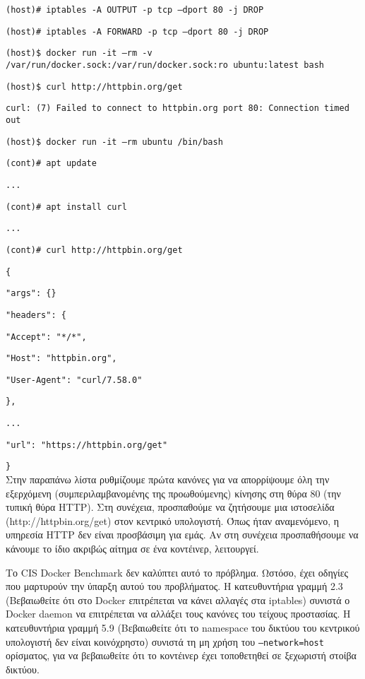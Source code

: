 \texttt{\textlatin{(host)\# iptables -A OUTPUT -p tcp --dport 80 -j DROP}}

\texttt{\textlatin{(host)\# iptables -A FORWARD -p tcp --dport 80 -j DROP}}

\texttt{\textlatin{(host)\$ docker run -it --rm -v /var/run/docker.sock:/var/run/docker.sock:ro ubuntu:latest bash}}

\texttt{\textlatin{(host)\$ curl http://httpbin.org/get}}

\texttt{\textlatin{curl: (7) Failed to connect to httpbin.org port 80: Connection timed out}}

\texttt{\textlatin{(host)\$ docker run -it --rm ubuntu /bin/bash}}

\texttt{\textlatin{(cont)\# apt update}}

\texttt{\textlatin{...}}

\texttt{\textlatin{(cont)\# apt install curl}}

\texttt{\textlatin{...}}

\texttt{\textlatin{(cont)\# curl http://httpbin.org/get}}

\texttt{\textlatin{\{}}

\texttt{\textlatin{"args": \{\}}}

\texttt{\textlatin{"headers": \{}}

\texttt{\textlatin{"Accept": "*/*",}}

\texttt{\textlatin{"Host": "httpbin.org",}}

\texttt{\textlatin{"User-Agent": "curl/7.58.0"}}

\texttt{\textlatin{\},}}

\texttt{\textlatin{...}}

\texttt{\textlatin{"url": "https://httpbin.org/get"}}

\texttt{\textlatin{\}}} \\


Στην παραπάνω λίστα ρυθμίζουμε πρώτα κανόνες για να απορρίψουμε όλη την
εξερχόμενη (συμπεριλαμβανομένης της προωθούμενης) κίνησης στη θύρα 80 (την
τυπική θύρα \textlatin{HTTP}). Στη συνέχεια, προσπαθούμε να ζητήσουμε
μια ιστοσελίδα (\textlatin{http://httpbin.org/get}) στον κεντρικό υπολογιστή.
Όπως ήταν αναμενόμενο, η υπηρεσία \textlatin{HTTP} δεν είναι προσβάσιμη για
εμάς. Αν στη συνέχεια προσπαθήσουμε να κάνουμε το ίδιο ακριβώς αίτημα
σε ένα κοντέινερ, λειτουργεί.

Το \textlatin{CIS Docker Benchmark} δεν καλύπτει αυτό το πρόβλημα. Ωστόσο,
έχει οδηγίες που μαρτυρούν την ύπαρξη αυτού του προβλήματος. Η κατευθυντήρια
γραμμή 2.3 (Βεβαιωθείτε ότι στο \textlatin{Docker} επιτρέπεται να κάνει αλλαγές
στα \textlatin{iptables}) συνιστά ο \textlatin{Docker daemon} να επιτρέπεται να
αλλάξει τους κανόνες του τείχους προστασίας. Η κατευθυντήρια γραμμή 5.9
(Βεβαιωθείτε ότι το \textlatin{namespace} του δικτύου του κεντρικού υπολογιστή
δεν είναι κοινόχρηστο) συνιστά τη μη χρήση του \texttt{\textlatin{--network=host}}
ορίσματος, για να βεβαιωθείτε ότι το κοντέινερ έχει τοποθετηθεί σε ξεχωριστή
στοίβα δικτύου.

